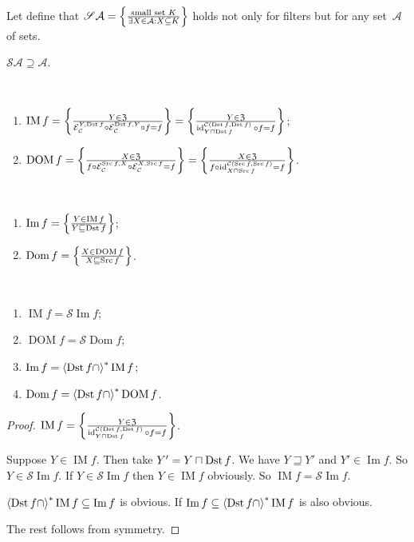 Let define that
$\mathscr{S}\mathcal{A}=\left\{ \frac{\text{small set }K}{
\exists X\in\mathcal{A}:X\subseteq K}\right\}$
holds not only for filters but for any set~$\mathcal{A}$ of
sets.

\begin{obvious}
$\mathscr{S}\mathcal{A}\supseteq\mathcal{A}$.
\end{obvious}

\begin{defn}
~
\begin{enumerate}
\item $\operatorname{IM} f = \left\{ \frac{Y \in \mathfrak{Z}}{\mathcal{E}_{\mathcal{C}}^{Y, \operatorname{Dst} f} \circ \mathcal{E}_{\mathcal{C}}^{\operatorname{Dst} f,
Y} \circ f = f}\right\} = \left\{ \frac{Y \in \mathfrak{Z}}{\operatorname{id}^{\mathcal{C}(\operatorname{Dst} f,\operatorname{Dst} f)}_{Y\sqcap\operatorname{Dst} f} \circ f = f}\right\}$;
\item $\operatorname{DOM} f = \left\{ \frac{X \in \mathfrak{Z}}{f\circ\mathcal{E}_{\mathcal{C}}^{\operatorname{Src} f, X} \circ \mathcal{E}_{\mathcal{C}}^{X, \operatorname{Src} f} = f}\right\} = \left\{ \frac{X \in \mathfrak{Z}}{f \circ \operatorname{id}^{\mathcal{C}(\operatorname{Src} f,\operatorname{Src} f)}_{X\sqcap\operatorname{Src} f} = f}\right\}$.
\end{enumerate}
\end{defn}

\begin{defn}
~
\begin{enumerate}
\item $\operatorname{Im} f = \left\{ \frac{Y\in\operatorname{IM} f}{Y\sqsubseteq\operatorname{Dst} f}\right\}$;
\item $\operatorname{Dom} f = \left\{ \frac{X\in\operatorname{DOM} f}{X\sqsubseteq\operatorname{Src} f}\right\}$.
\end{enumerate}
\end{defn}

\begin{prop}
~
\begin{enumerate}
\item $\operatorname{IM} f = \mathscr{S}\operatorname{Im} f$;
\item $\operatorname{DOM} f = \mathscr{S}\operatorname{Dom} f$;
\item $\operatorname{Im} f = \left\langle \operatorname{Dst} f\cap\right\rangle ^{\ast}\operatorname{IM} f$;
\item $\operatorname{Dom} f = \left\langle \operatorname{Dst} f\cap\right\rangle ^{\ast}\operatorname{DOM} f$.
\end{enumerate}
\end{prop}

\begin{proof}
$\operatorname{IM} f =
\left\{ \frac{Y \in \mathfrak{Z}}{\operatorname{id}^{\mathcal{C}(\operatorname{Dst} f,\operatorname{Dst} f)}_{Y\sqcap\operatorname{Dst} f} \circ f = f}\right\}$.

Suppose $Y\in\operatorname{IM}f$. Then take $Y'=Y\sqcap\operatorname{Dst} f$. We have $Y\sqsupseteq Y'$ and $Y'\in\operatorname{Im}f$. So $Y\in\mathscr{S}\operatorname{Im}f$. If $Y\in\mathscr{S}\operatorname{Im}f$ then $Y\in\operatorname{IM}f$ obviously.
So $\operatorname{IM} f = \mathscr{S}\operatorname{Im} f$.

$\left\langle \operatorname{Dst} f\cap\right\rangle ^{\ast}\operatorname{IM}f\subseteq
\operatorname{Im}f$ is obvious. If
$\operatorname{Im}f\subseteq\left\langle \operatorname{Dst} f\cap\right\rangle ^{\ast}\operatorname{IM}f$ is also obvious.

The rest follows from symmetry.
\end{proof}

